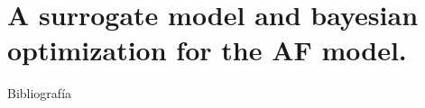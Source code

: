 \documentclass[10pt]{beamer}
\begin{document}
\section{A surrogate model and bayesian optimization for the AF model.}

\begin{frame}[allowframebreaks]{Bibliografía}


\tiny{}
\end{frame}

{\BiOM
\begin{frame}
\end{frame}}
\end{document}
